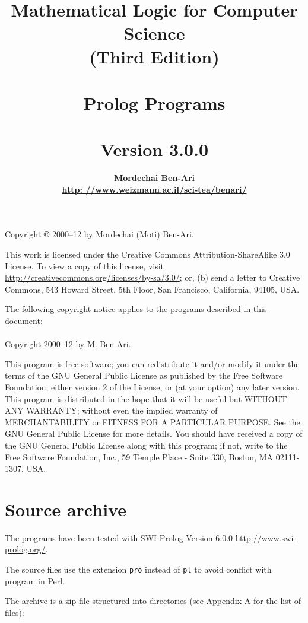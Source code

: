 \documentclass[11pt]{article}
\author{\bfseries Mordechai Ben-Ari\\\url{http: //www.weizmann.ac.il/sci-tea/benari/}}
\title{\bfseries Mathematical Logic for Computer Science\\
\bfseries\large (Third Edition)\\\mbox{}\\
\bfseries\Large Prolog Programs\\\mbox{}\\
\bfseries\normalsize Version 3.0.0}
\newcommand*{\p}[1]{\textup{\texttt{#1}}}
\begin{document}
\maketitle
\thispagestyle{empty}

\bigskip

\begin{center}
Copyright \copyright{} 2000--12 by Mordechai (Moti) Ben-Ari.
\end{center}
This work is licensed under the Creative Commons Attribution-ShareAlike 3.0
License. To view a copy of this license, visit
\url{http://creativecommons.org/licenses/by-sa/3.0/}; or, (b) send a letter
to Creative Commons, 543 Howard Street, 5th Floor, San Francisco,
California, 94105, USA.

\vfill
 
\begin{center}
The following copyright notice applies to the programs described in this
document:\mbox{}\\\mbox{}\\
Copyright 2000--12 by M. Ben-Ari.
\end{center}

This program is free software; you can redistribute it and/or
modify it under the terms of the GNU General Public License
as published by the Free Software Foundation; either version 2
of the License, or (at your option) any later version.
This program is distributed in the hope that it will be useful
but WITHOUT ANY WARRANTY; without even the implied warranty of
MERCHANTABILITY or FITNESS FOR A PARTICULAR PURPOSE.
See the GNU General Public License for more details.
You should have received a copy of the GNU General Public License
along with this program; if not, write to the Free Software
Foundation, Inc., 59 Temple Place - Suite 330, Boston, MA
02111-1307, USA.

\newpage



\section{Source archive}\label{s.archive}

The programs have been tested with SWI-Prolog Version 6.0.0
\url{http://www.swi-prolog.org/}.

The source files use the extension \p{pro} instead of
\p{pl} to avoid conflict with program in Perl.

The archive is a zip file structured into directories (see Appendix A
for the list of files):
\end{document}
